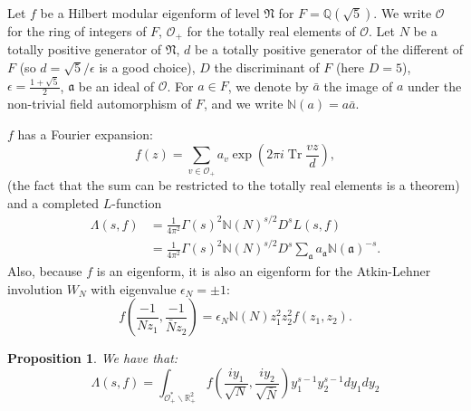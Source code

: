 \documentclass{article}
\DeclareMathOperator{\Tr}{Tr}
\theoremstyle{plain}
\newtheorem{proposition}{Proposition}
\begin{document}
Let $f$ be a Hilbert modular eigenform of level $\mathfrak{N}$ for $F=\mathbb{Q}(\sqrt{5})$. We write $\mathcal{O}$ for the ring of integers of $F$, $\mathcal{O}_+$ for the totally real elements of $\mathcal{O}$. Let $N$ be a totally positive generator of $\mathfrak{N}$, $d$ be a totally positive generator of the different of $F$ (so $d=\sqrt{5}/\epsilon$ is a good choice), $D$ the discriminant of $F$ (here $D=5$), $\epsilon=\frac{1+\sqrt{5}}{2}$, $\mathfrak{a}$ be an ideal of $\mathcal{O}$. For $a \in F$, we denote by $\bar{a}$ the image of $a$ under the non-trivial field automorphism of $F$, and we write $\mathbb{N}(a)=a\bar{a}$. 

$f$ has a Fourier expansion:
\begin{equation*}
f(z)=\sum_{v \in \mathcal{O}_+} a_v \exp\left(2\pi i\Tr \frac{v z}{d}\right),
\end{equation*}
(the fact that the sum can be restricted to the totally real elements is a theorem) and a completed $L$-function
\begin{align*}
\Lambda(s,f) & = \frac{1}{4\pi^2} \Gamma(s)^2 \mathbb{N}(N)^{s/2} D^s L(s,f)\\
&= \frac{1}{4\pi^2} \Gamma(s)^2 \mathbb{N}(N)^{s/2} D^s \sum_{\mathfrak{a}}a_{\mathfrak{a}}\mathbb{N}(\mathfrak{a})^{-s}.
\end{align*}
Also, because $f$ is an eigenform, it is also an eigenform for the Atkin-Lehner involution $W_N$ with eigenvalue $\epsilon_N= \pm 1$:
\begin{equation*}
f\left(\frac{-1}{Nz_1},\frac{-1}{\bar{N}z_2} \right)=\epsilon_N \mathbb{N}(N)z_1^2z_2^2f(z_1, z_2).
\end{equation*}

\begin{proposition}
We have that:
\begin{equation*}
\Lambda(s,f)= \int_{\mathcal{O}_+^*\backslash \mathbb{R}^2_+} f\left(\frac{iy_1}{\sqrt{N}},\frac{iy_2}{\sqrt{\bar{N}}}\right) y_1^{s-1}y_2^{s-1} dy_1 dy_2
\end{equation*}
\end{proposition}
\end{document}
